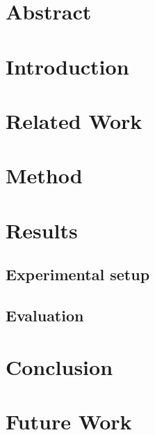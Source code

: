 \documentclass[a4paper, 12pt]{article}
\begin{document}


\setcounter{page}{2}
\tableofcontents
\newpage


\section*{Abstract}


\section{Introduction}


% 

\section{Related Work}


\section{Method}


\section{Results}
\subsection{Experimental setup}
\subsection{Evaluation}
\section{Conclusion}
\section{Future Work}

\printbibliography
\end{document}
